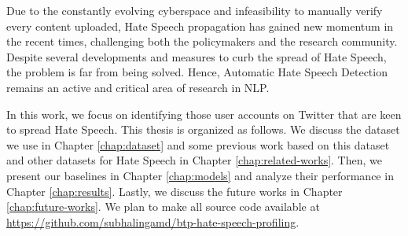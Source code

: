 




Due to the constantly evolving cyberspace and infeasibility to manually verify every content uploaded, Hate Speech propagation has gained new momentum in the recent times, challenging both the policymakers and the research community. Despite several developments and measures to curb the spread of Hate Speech, the problem is far from being solved. Hence, Automatic Hate Speech Detection remains an active and critical area of research in NLP.

In this work, we focus on identifying those user accounts on Twitter that are keen to spread Hate Speech.
This thesis is organized as follows.
We discuss the dataset we use in Chapter \ref{chap:dataset} and some previous work based on this dataset and other datasets for Hate Speech in Chapter \ref{chap:related-works}. Then, we present our baselines in Chapter \ref{chap:models} and analyze their performance in Chapter \ref{chap:results}. Lastly, we discuss the future works in Chapter \ref{chap:future-works}. We plan to make all source code available at \url{https://github.com/subhalingamd/btp-hate-speech-profiling}.
